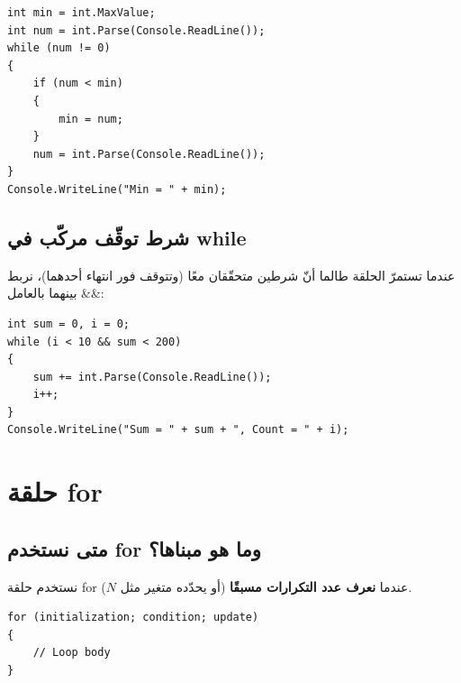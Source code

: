 \documentclass[14pt]{extarticle}
\begin{document}
\begin{boxExample}
\begin{english}
\begin{verbatim}
int min = int.MaxValue;
int num = int.Parse(Console.ReadLine());
while (num != 0)
{
    if (num < min)
    {
        min = num;
    }
    num = int.Parse(Console.ReadLine());
}
Console.WriteLine("Min = " + min);
\end{verbatim}
\end{english}
\end{boxExample}

\filbreak
\subsection{شرط توقّف مركّب في \textenglish{while}}
عندما تستمرّ الحلقة طالما أنّ شرطين متحقّقان معًا (وتتوقف فور انتهاء أحدهما)، نربط بينهما بالعامل \textenglish{\&\&}:

\begin{boxExample}
\begin{english}
\begin{verbatim}
int sum = 0, i = 0;
while (i < 10 && sum < 200)
{
    sum += int.Parse(Console.ReadLine());
    i++;
}
Console.WriteLine("Sum = " + sum + ", Count = " + i);
\end{verbatim}
\end{english}
\end{boxExample}

\clearpage
\section{حلقة \textenglish{for}}

\subsection{متى نستخدم \textenglish{for} وما هو مبناها؟}
نستخدم حلقة \textenglish{for} عندما \textbf{نعرف عدد التكرارات مسبقًا} (أو يحدّده متغير مثل $N$).

\begin{boxCode}
\begin{english}
\begin{verbatim}
for (initialization; condition; update)
{
    // Loop body
}
\end{verbatim}
\end{english}
\end{boxCode}
\end{document}
